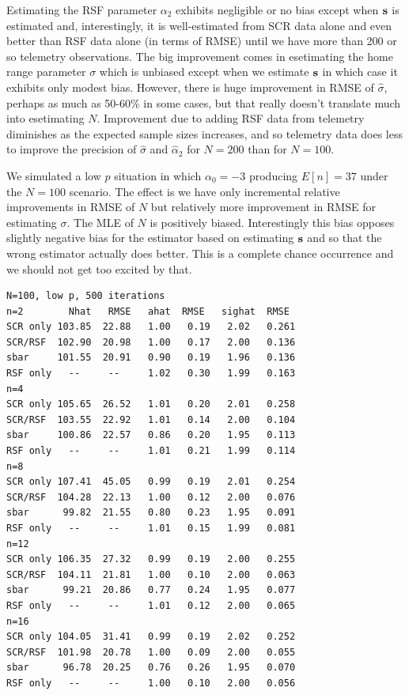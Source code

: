 Estimating the RSF parameter $\alpha_{2}$ exhibits negligible or no
bias except when ${\bf s}$ is estimated and, interestingly, it is
well-estimated from SCR data alone and even better than RSF data alone
(in terms of RMSE) until we have more than 200 or so telemetry
observations.  The big improvement comes in esetimating the home range
parameter $\sigma$ which is unbiased except when we estimate ${\bf s}$
in which case it exhibits only modest bias.  However, there is huge
improvement in RMSE of $\hat{\sigma}$, perhaps as much as 50-60\% in
some cases, but that really doesn't translate much into esetimating
$N$.  Improvement due to adding RSF data from telemetry diminishes as
the expected sample sizes increases, and so telemetry data does less
to improve the precision of
$\hat{\sigma}$ and $\hat{\alpha}_{2}$
for $N=200$ than for $N=100$.

We simulated a low $p$ situation in which $\alpha_{0}=-3$ producing
$E[n] = 37$ under the $N=100$ scenario.  The effect is we have only
incremental relative improvements in RMSE of $N$ but relatively more
improvement in RMSE for estimating $\sigma$. The MLE of
$N$ is positively biased.
Interestingly this bias opposes slightly negative bias for
the estimator based on estimating ${\bf s}$ and so that the wrong
estimator actually does better. This is a complete chance occurrence
and we should not get too excited by that.
{\small
\begin{verbatim}
N=100, low p, 500 iterations
n=2        Nhat   RMSE   ahat  RMSE   sighat  RMSE
SCR only 103.85  22.88   1.00   0.19   2.02   0.261
SCR/RSF  102.90  20.98   1.00   0.17   2.00   0.136
sbar     101.55  20.91   0.90   0.19   1.96   0.136
RSF only   --     --     1.02   0.30   1.99   0.163
n=4
SCR only 105.65  26.52   1.01   0.20   2.01   0.258
SCR/RSF  103.55  22.92   1.01   0.14   2.00   0.104
sbar     100.86  22.57   0.86   0.20   1.95   0.113
RSF only   --     --     1.01   0.21   1.99   0.114
n=8
SCR only 107.41  45.05   0.99   0.19   2.01   0.254
SCR/RSF  104.28  22.13   1.00   0.12   2.00   0.076
sbar      99.82  21.55   0.80   0.23   1.95   0.091
RSF only   --     --     1.01   0.15   1.99   0.081
n=12
SCR only 106.35  27.32   0.99   0.19   2.00   0.255
SCR/RSF  104.11  21.81   1.00   0.10   2.00   0.063
sbar      99.21  20.86   0.77   0.24   1.95   0.077
RSF only   --     --     1.01   0.12   2.00   0.065
n=16
SCR only 104.05  31.41   0.99   0.19   2.02   0.252
SCR/RSF  101.98  20.78   1.00   0.09   2.00   0.055
sbar      96.78  20.25   0.76   0.26   1.95   0.070
RSF only   --     --     1.00   0.10   2.00   0.056
\end{verbatim}
}


